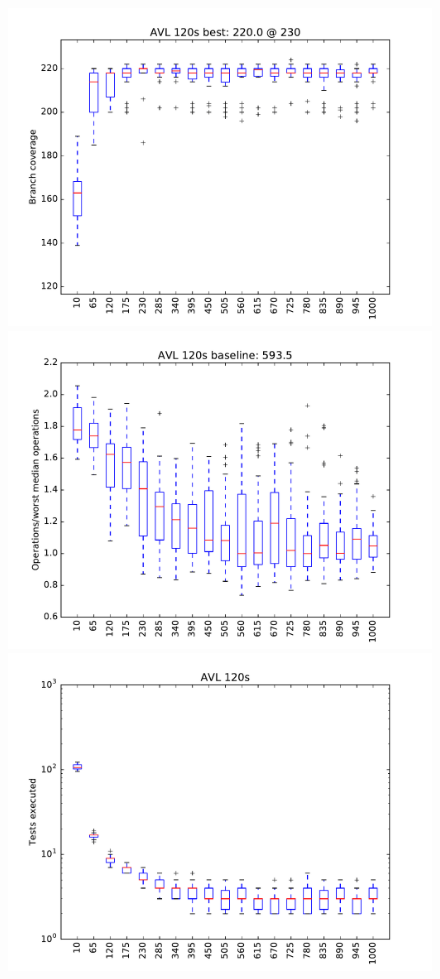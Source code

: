 \begin{figure}
\includegraphics[width=\columnwidth]{graphs/AVLrand120}
\includegraphics[width=\columnwidth]{graphs/opsavlrand120}
\includegraphics[width=\columnwidth]{graphs/execavlrand120}
\end{figure}


